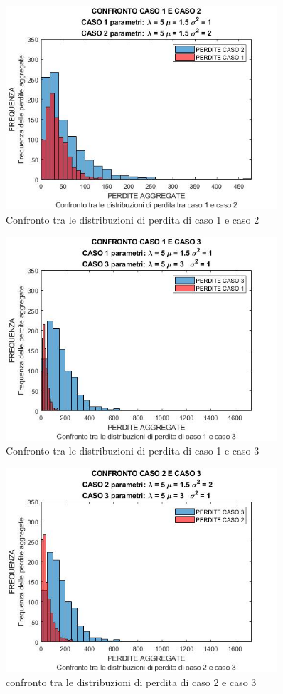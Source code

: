 \documentclass[titlepage]{article}
\begin{document}
\begin{itemize}
{\begin{figure}[htbp]
	\centering
	\includegraphics[width=0.9\textwidth]{1VS2.jpg}
	\caption{\label{fig:losss.png}Confronto tra le distribuzioni di perdita di caso 1 e caso 2}
\end{figure}
\begin{figure}[htbp]
	\centering
	\includegraphics[width=0.9\textwidth]{1VS3.jpg}
	\caption{\label{fig:losss.png}Confronto tra le distribuzioni di perdita di caso 1 e caso 3}
\end{figure}
\begin{figure}[htbp]
	\centering
	\includegraphics[width=0.9\textwidth]{2VS3.jpg}
	\caption{\label{fig:losss.png}confronto tra le distribuzioni di perdita di caso 2 e caso 3}
\end{figure}
}
\end{itemize}
\end{document}
